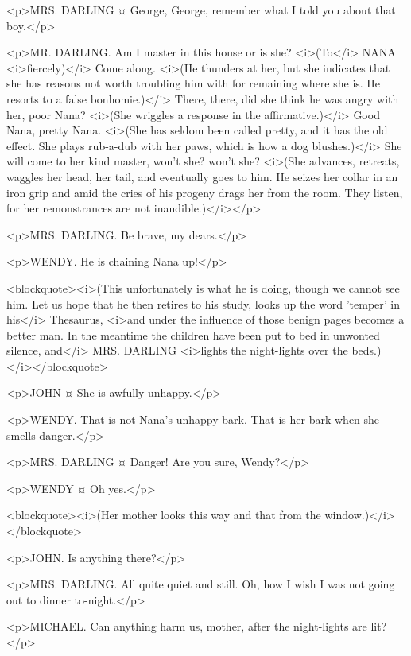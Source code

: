 <p>MRS. DARLING ¤
George, George, remember what I told you about that boy.</p>

<p>MR. DARLING. Am I master in this house or is she? <i>(To</i> NANA <i>fiercely)</i> Come along. <i>(He thunders at her, but she indicates that she has reasons not worth troubling him with for remaining where she is. He resorts to a false bonhomie.)</i> There, there, did she think he was angry with her, poor Nana? <i>(She wriggles a response in the affirmative.)</i> Good Nana, pretty Nana. <i>(She has seldom been called pretty, and it has the old effect. She plays rub-a-dub with her paws, which is how a dog blushes.)</i> She will come to her kind master, won't she? won't she? <i>(She advances, retreats, waggles her head, her tail, and eventually goes to him. He seizes her collar in an iron grip and amid the cries of his progeny drags her from the room. They listen, for her remonstrances are not inaudible.)</i></p>

<p>MRS. DARLING. Be brave, my dears.</p>

<p>WENDY. He is chaining Nana up!</p>

<blockquote><i>(This unfortunately is what he is doing, though we cannot see him. Let us hope that he then retires to his study, looks up the word 'temper' in his</i> Thesaurus, <i>and under the influence of those benign pages becomes a better man. In the meantime the children have been put to bed in unwonted silence, and</i> MRS. DARLING <i>lights the night-lights over the beds.)</i></blockquote>

<p>JOHN ¤
She is awfully unhappy.</p>

<p>WENDY. That is not Nana's unhappy bark. That is her bark when she smells danger.</p>

<p>MRS. DARLING ¤
Danger! Are you sure, Wendy?</p>

<p>WENDY ¤
Oh yes.</p>

<blockquote><i>(Her mother looks this way and that from the window.)</i></blockquote>

<p>JOHN. Is anything there?</p>

<p>MRS. DARLING. All quite quiet and still. Oh, how I wish I was not going out to dinner to-night.</p>

<p>MICHAEL. Can anything harm us, mother, after the night-lights are lit?</p>

